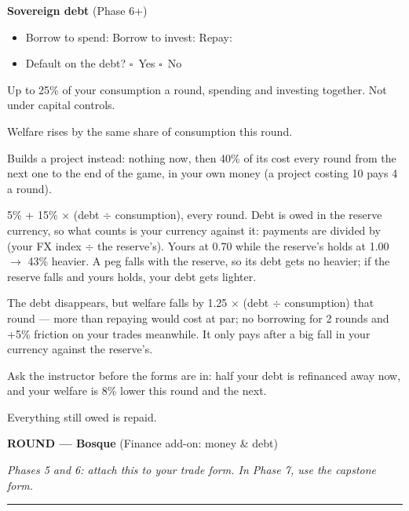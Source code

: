 \documentclass[11pt]{article}
\newcommand{\blank}[1]{\underline{\hspace{#1}}}
\newcommand{\boxx}{$\square$}
\newcommand{\hr}{\par\vspace{2pt}\noindent\rule{\linewidth}{0.4pt}\par\vspace{2pt}}
\begin{document}
\vspace{4pt}
{\bfseries Sovereign debt} (Phase 6+)\par
\begin{itemize}[nosep,leftmargin=1.4em]
  \item Borrow to spend: \blank{2.2cm} \quad Borrow to invest: \blank{2.2cm} \quad Repay: \blank{2.2cm}
  \item Default on the debt? \quad \boxx\ Yes \quad \boxx\ No
\end{itemize}
{\small
\begin{description}[nosep,style=sameline,leftmargin=5.6em,font=\normalfont\bfseries]
  \item[Borrow] Up to 25\% of your consumption a round, spending and investing together. Not under capital controls.
  \item[Spend] Welfare rises by the same share of consumption this round.
  \item[Invest] Builds a project instead: nothing now, then 40\% of its cost every round from the next one to the end of the game, in your own money (a project costing 10 pays 4 a round).
  \item[Interest] 5\% + 15\% $\times$ (debt $\div$ consumption), every round. Debt is owed in the reserve currency, so what counts is your currency against it: payments are divided by (your FX index $\div$ the reserve's). Yours at 0.70 while the reserve's holds at 1.00 $\to$ 43\% heavier. A peg falls with the reserve, so its debt gets no heavier; if the reserve falls and yours holds, your debt gets lighter.
  \item[Default] The debt disappears, but welfare falls by 1.25 $\times$ (debt $\div$ consumption) that round --- more than repaying would cost at par; no borrowing for 2 rounds and +5\% friction on your trades meanwhile. It only pays after a big fall in your currency against the reserve's.
  \item[IMF] Ask the instructor before the forms are in: half your debt is refinanced away now, and your welfare is 8\% lower this round and the next.
  \item[Last round] Everything still owed is repaid.
\end{description}}

\newpage

{\large\bfseries ROUND \blank{1cm} --- Bosque} \hfill (Finance add-on: money \& debt)\par
\textit{Phases 5 and 6: attach this to your trade form. In Phase 7, use the capstone form.}
\hr
\end{document}
